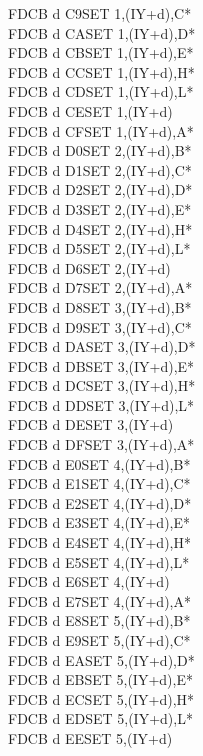\documentclass[oneside,a4paper]{book}
\begin{document}
\begin{multicols}{3}
{\begin{tabbing}
FDCB d C9\>SET 1,(IY+d),C*\\
FDCB d CA\>SET 1,(IY+d),D*\\
FDCB d CB\>SET 1,(IY+d),E*\\
FDCB d CC\>SET 1,(IY+d),H*\\
FDCB d CD\>SET 1,(IY+d),L*\\
FDCB d CE\>SET 1,(IY+d)\\
FDCB d CF\>SET 1,(IY+d),A*\\
FDCB d D0\>SET 2,(IY+d),B*\\
FDCB d D1\>SET 2,(IY+d),C*\\
FDCB d D2\>SET 2,(IY+d),D*\\
FDCB d D3\>SET 2,(IY+d),E*\\
FDCB d D4\>SET 2,(IY+d),H*\\
FDCB d D5\>SET 2,(IY+d),L*\\
FDCB d D6\>SET 2,(IY+d)\\
FDCB d D7\>SET 2,(IY+d),A*\\
FDCB d D8\>SET 3,(IY+d),B*\\
FDCB d D9\>SET 3,(IY+d),C*\\
FDCB d DA\>SET 3,(IY+d),D*\\
FDCB d DB\>SET 3,(IY+d),E*\\
FDCB d DC\>SET 3,(IY+d),H*\\
FDCB d DD\>SET 3,(IY+d),L*\\
FDCB d DE\>SET 3,(IY+d)\\
FDCB d DF\>SET 3,(IY+d),A*\\
FDCB d E0\>SET 4,(IY+d),B*\\
FDCB d E1\>SET 4,(IY+d),C*\\
FDCB d E2\>SET 4,(IY+d),D*\\
FDCB d E3\>SET 4,(IY+d),E*\\
FDCB d E4\>SET 4,(IY+d),H*\\
FDCB d E5\>SET 4,(IY+d),L*\\
FDCB d E6\>SET 4,(IY+d)\\
FDCB d E7\>SET 4,(IY+d),A*\\
FDCB d E8\>SET 5,(IY+d),B*\\
FDCB d E9\>SET 5,(IY+d),C*\\
FDCB d EA\>SET 5,(IY+d),D*\\
FDCB d EB\>SET 5,(IY+d),E*\\
FDCB d EC\>SET 5,(IY+d),H*\\
FDCB d ED\>SET 5,(IY+d),L*\\
FDCB d EE\>SET 5,(IY+d)\\

\end{tabbing}}
\end{multicols}
\end{document}
